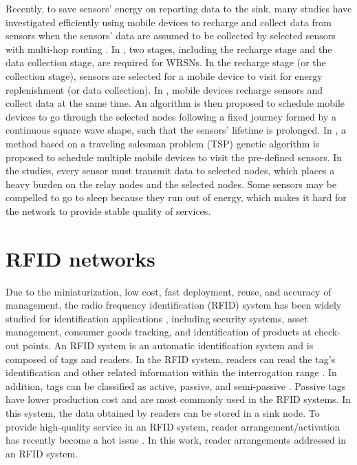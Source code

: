 Recently, to save sensors' energy on reporting data to the sink,
many studies have investigated efficiently using mobile devices to
recharge and collect data from sensors when the sensors' data are
assumed to be collected by selected sensors with multi-hop routing
\cite{IEEE18, IEEE10, INFOCOM9}. In \cite{IEEE18}, two stages,
including the recharge stage and the data collection stage, are
required for WRSNs. In the recharge stage (or the collection stage),
sensors are selected for a mobile device to visit for energy
replenishment (or data collection). In \cite{IEEE10}, mobile devices
recharge sensors and collect data at the same time. An algorithm is
then proposed to schedule mobile devices to go through the selected
nodes following a fixed journey formed by a continuous square wave
shape, such that the sensors' lifetime is prolonged. In
\cite{INFOCOM9}, a method based on a traveling salesman problem
(TSP) genetic algorithm is proposed to schedule multiple mobile
devices to visit the pre-defined sensors. In the studies, every
sensor must transmit data to selected nodes, which places a heavy
burden on the relay nodes and the selected nodes. Some sensors may
be compelled to go to sleep because they run out of energy, which
makes it hard for the network to provide stable quality of services.


\section{RFID networks}

Due to the miniaturization, low cost, fast deployment, reuse, and
accuracy of management, the radio frequency identification (RFID)
system has been widely studied for identification applications
\cite{RFID1,RFID2,RFID3}, including security systems, asset
management, consumer goods tracking, and identification of products
at check-out points. An RFID system is an automatic identification
system and is composed of tags and readers. In the RFID system,
readers can read the tag's identification and other related
information within the interrogation range \cite{reader1,reader2}.
In addition, tags can be classified as active, passive, and
semi-passive \cite{tag1,tag2}. Passive tags have lower production
cost and are most commonly used in the RFID systems. In this system,
the data obtained by readers can be stored in a sink node. To
provide high-quality service in an RFID system, reader
arrangement/activation has recently become a hot issue \cite{d1,d2}.
In this work, reader arrangements addressed in an RFID system.


